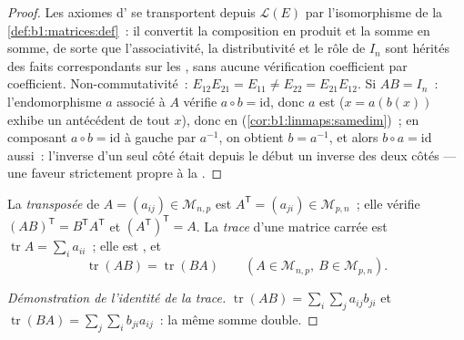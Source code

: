 \begin{proof}
Les axiomes d' se transportent depuis $\mathcal{L}(E)$ par
l'isomorphisme de la \cref{def:b1:matrices:def}~: il convertit la
composition en produit et la somme en somme, de sorte que
l'associativité, la distributivité et le rôle de $I_n$ sont hérités des
faits correspondants sur les , sans aucune vérification
coefficient par coefficient. Non-commutativité~: $E_{12}E_{21} = E_{11}
\neq E_{22} = E_{21}E_{12}$. Si $AB = I_n$~: l'endomorphisme $a$
associé à $A$ vérifie $a \circ b = \mathrm{id}$, donc $a$ est
 ($x = a(b(x))$ exhibe un antécédent de tout $x$), donc
 en  (\cref{cor:b1:linmaps:samedim})~; en
composant $a \circ b = \mathrm{id}$ à gauche par $a^{-1}$, on obtient
$b = a^{-1}$, et alors $b\circ a = \mathrm{id}$ aussi~: l'inverse d'un
seul côté était depuis le début un inverse des deux côtés --- une
faveur strictement propre à la .
\end{proof}

\begin{definition}\label{def:b1:matrices:transpose}
La \emph{transposée} de $A = (a_{ij}) \in \mathcal{M}_{n,p}$ est $A^{\mathsf T}
= (a_{ji}) \in \mathcal{M}_{p,n}$~; elle vérifie $(AB)^{\mathsf T} = B^{\mathsf T}
A^{\mathsf T}$ et $(A^{\mathsf T})^{\mathsf T} = A$. La
\emph{trace} d'une matrice carrée est $\operatorname{tr} A
= \sum_i a_{ii}$~; elle est , et
\[
\operatorname{tr}(AB) = \operatorname{tr}(BA)
\qquad (A \in \mathcal{M}_{n,p},\ B \in \mathcal{M}_{p,n}).
\]
\end{definition}

\begin{proof}[Démonstration de l'identité de la trace]
$\operatorname{tr}(AB) = \sum_i \sum_j a_{ij} b_{ji}$ et
$\operatorname{tr}(BA) = \sum_j \sum_i b_{ji} a_{ij}$~: la même
somme double.
\end{proof}


